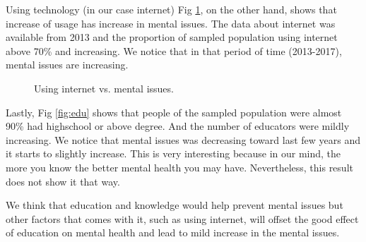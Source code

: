 \documentclass[letterpaper, 10 pt, conference]{ieeeconf}  %
\begin{document}
Using technology (in our case internet) Fig \ref{fig:internt}, on the other hand, shows that increase of usage has increase in mental issues.
The data about internet was available from 2013 and the proportion of sampled population using internet above 70\% and increasing.
We notice that in that period of time (2013-2017), mental issues are increasing.

\begin{figure}[!htb]
        \caption{\label{fig:internt} Using internet vs. mental issues.}
\end{figure}

Lastly, Fig \ref{fig:edu} shows that people of the sampled population were almost 90\% had highschool or above degree.
And the number of educators were mildly increasing. We notice that mental issues was decreasing toward last few years and 
it starts to slightly increase. This is very interesting because in our mind, the more you know the better mental health you may have.
Nevertheless, this result does not show it that way. 

We think that education and knowledge would help prevent mental issues but other factors that comes with it, such as using internet, will
offset the good effect of education on mental health and lead to mild increase in the mental issues.
\end{document}

